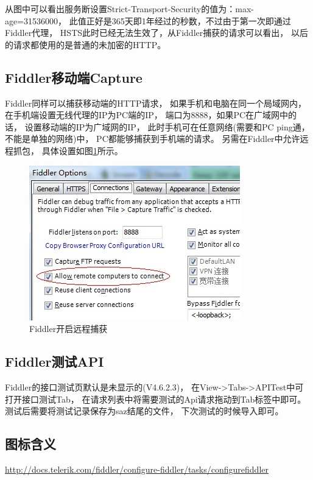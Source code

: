 \documentclass{book}
\begin{document}
从图中可以看出服务断设置Strict-Transport-Security的值为：max-age=31536000，
此值正好是365天即1年经过的秒数，不过由于第一次即通过Fiddler代理，
HSTS此时已经无法生效了，从Fiddler捕获的请求可以看出，
以后的请求都使用的是普通的未加密的HTTP。

\subsection{Fiddler移动端Capture}

Fiddler同样可以捕获移动端的HTTP请求，
如果手机和电脑在同一个局域网内，
在手机端设置无线代理的IP为PC端的IP，
端口为8888，如果PC在广域网中的话，
设置移动端的IP为广域网的IP，
此时手机可在任意网络(需要和PC ping通，不能是单独的网络)中，
PC都能够捕获到手机端的请求。
另需在Fiddler中允许远程抓包，
具体设置如图\ref{fig:FiddlerCaptureMobilePackage}所示。

\begin{figure}[htbp]
	\centering
	\includegraphics[scale=0.5]{FiddlerCaptureMobilePackage.jpg}
	\caption{Fiddler开启远程捕获}
	\label{fig:FiddlerCaptureMobilePackage}
\end{figure}

\subsection{Fiddler测试API}

Fiddler的接口测试页默认是未显示的(V4.6.2.3)，
在View->Tabs->APITest中可打开接口测试Tab，
在请求列表中将需要测试的Api请求拖动到Tab标签中即可。
测试后需要将测试记录保存为saz结尾的文件，
下次测试的时候导入即可。

\subsection{图标含义}

\url{http://docs.telerik.com/fiddler/configure-fiddler/tasks/configurefiddler}
\end{document}
